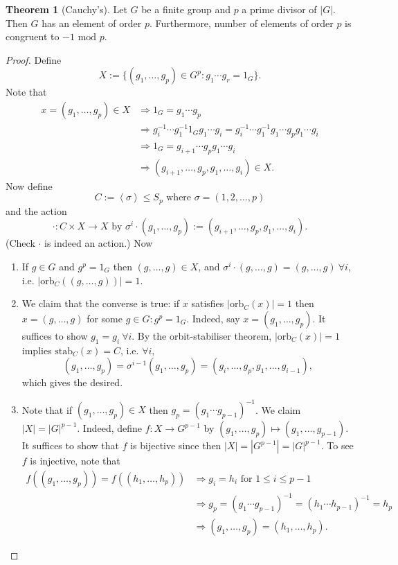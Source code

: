 \documentclass[a4paper]{article}
\newcommand{\la}{\left\langle}
\newcommand{\ra}{\right\rangle}
\newcommand{\orb}{\text{orb}}
\newcommand{\stab}{\text{stab}}
\newcommand{\Mod}{\text{ mod }}
\theoremstyle{definition}
\newtheorem{thm}[defn]{Theorem}
\begin{document}
\begin{thm}[Cauchy's]
Let $G$ be a finite group and $p$ a prime divisor of $|G|$. Then $G$ has an element of order $p$. Furthermore, number of elements of order $p$ is congruent to $-1\Mod p$.
\end{thm}
\begin{proof}
Define
\[
X:=\{(g_1,\ldots,g_p)\in G^p:g_1\cdots g_r=1_G\}.
\]
Note that
\[
\begin{aligned}
x=(g_1,\ldots,g_p)\in X &\Rightarrow 1_G=g_1\cdots g_p \\
&\Rightarrow g_i^{-1}\cdots g_1^{-1} 1_G g_1\cdots g_i=g_i^{-1}\cdots g_1^{-1} g_1\cdots g_p g_1\cdots g_i \\
&\Rightarrow 1_G=g_{i+1}\cdots g_pg_1\cdots g_i \\
&\Rightarrow (g_{i+1},\ldots ,g_p,g_1,\ldots ,g_i)\in X.
\end{aligned}
\]
Now define
\[
C:=\la\sigma\ra\leq S_p \text{ where }\sigma=(1,2,\ldots,p)
\]
and the action
\[
\cdot :C\times X\rightarrow X \text{ by } \sigma^i\cdot (g_1,\ldots,g_p):=(g_{i+1},\ldots ,g_p,g_1,\ldots ,g_i).
\]
(Check $\cdot$ is indeed an action.) Now
\begin{enumerate}
\item If $g\in G$ and $g^p=1_G$ then $(g,\ldots,g)\in X$, and $\sigma^i\cdot(g,\ldots,g)=(g,\ldots,g) \ \forall i$, i.e. $|\orb_C((g,\ldots,g))|=1$.
\item We claim that the converse is true: if $x$ satisfies $|\orb_C(x)|=1$ then $x=(g,\ldots,g)$ for some $g\in G : g^p=1_G$. Indeed, say $x=(g_1,\ldots,g_p)$. It suffices to show $g_1=g_i \ \forall i$. By the orbit-stabiliser theorem, $|\orb_C(x)|=1$ implies $\stab_C(x)=C$, i.e. $\forall i,$
\[
(g_1,\ldots,g_p)=\sigma^{i-1}(g_1,\ldots,g_p)=(g_i,\ldots ,g_p,g_1,\ldots ,g_{i-1}),
\]
which gives the desired.
\item Note that if $(g_1,\ldots,g_p)\in X$ then $g_p=(g_1\cdots g_{p-1})^{-1}$. We claim $|X|=|G|^{p-1}$. Indeed, define $f:X\rightarrow G^{p-1}$ by $(g_1,\ldots,g_p)\mapsto (g_1,\ldots,g_{p-1})$. It suffices to show that $f$ is bijective since then $|X|=|G^{p-1}|=|G|^{p-1}$. To see $f$ is injective, note that
\[
\begin{aligned}
f((g_1,\ldots,g_p))=f((h_1,\ldots,h_p)) &\Rightarrow g_i=h_i \text{ for } 1\leq i\leq p-1 \\
&\Rightarrow g_p=(g_1\cdots g_{p-1})^{-1}=(h_1\cdots h_{p-1})^{-1}=h_p \\
&\Rightarrow (g_1,\ldots,g_p)=(h_1,\ldots,h_p).
\end{aligned}
\]
\end{enumerate}
\end{proof}
\end{document}

